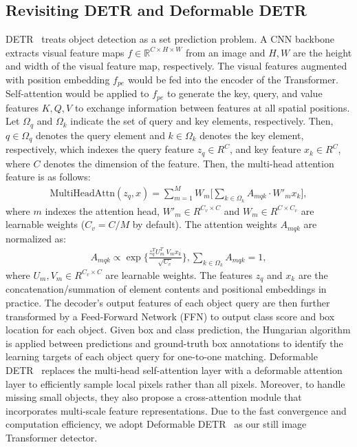 \documentclass[10pt,journal,compsoc]{IEEEtran}
\begin{document}
\subsection{Revisiting DETR and Deformable DETR}
\label{sec:DETR}
DETR~\cite{detr} treats object detection as a set prediction problem. A CNN backbone~\cite{he16res} extracts visual feature maps $f  \in \mathbb{R}^{C \times H \times W}$ from an image and $H,W$ are the height and width of the visual feature map, respectively. The visual features augmented with position embedding $f_{pe}$ would be fed into the encoder of the Transformer. Self-attention would be applied to $f_{pe}$ to generate the key, query, and value features $K, Q, V$ to exchange information between features at all spatial positions.
Let $\Omega_q$ and $\Omega_k$ indicate the set of query and key elements, respectively. Then, $q\in\Omega_q$ denotes the query element and $k\in\Omega_k$ denotes the key element, respectively, which indexes the query feature $z_q \in R^{C}$, and key feature $x_k \in R^{C}$, where $C$ denotes the dimension of the feature.  Then, the multi-head attention feature is as follows:
\begin{align}
    \text{MultiHeadAttn}(z_q, x) = \sum_{m=1}^{M} W_m \big[\sum_{k\in\Omega_k} A_{mqk} \cdot W'_m x_k \big],
    \label{eq:co-attention} 
\end{align}
where $m$ indexes the attention head, $W'_m \in R^{C_v \times C}$ and $W_m \in R^{C \times C_v}$ are learnable weights ($C_v = C/M$ by default). The attention weights $A_{mqk}$ are normalized as:
\begin{align}
   A_{mqk} \propto \exp\{\frac{z_q^T U_m^T~ V_m x_k}{\sqrt{C_v}}\}, \sum_{k\in\Omega_k} A_{mqk} = 1,
\end{align}
where $U_m, V_m \in R^{C_v \times C}$ are learnable weights. The features $z_q$ and $x_k$ are the concatenation/summation of element contents and positional embeddings in practice. 
The decoder's output features of each object query are then further transformed by a Feed-Forward Network (FFN) to output class score and box location for each object. Given box and class prediction, the Hungarian algorithm is applied between predictions and ground-truth box annotations to identify the learning targets of each object query for one-to-one matching. Deformable DETR~\cite{zhu2020deformable} replaces the multi-head self-attention layer with a deformable attention layer to efficiently sample local pixels rather than all pixels. Moreover, to handle missing small objects, they also propose a cross-attention module that incorporates multi-scale feature representations. Due to the fast convergence and computation efficiency, we adopt Deformable DETR~\cite{zhu2020deformable} as our still image Transformer detector.
\end{document}
